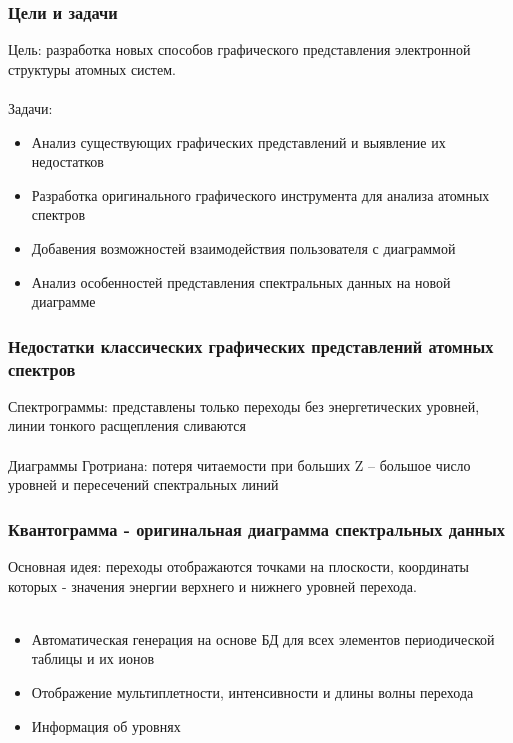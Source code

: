 \documentclass{beamer}
\begin{document}
\begin{frame}
\frametitle{Цели и задачи}
    Цель: разработка новых способов графического представления электронной структуры атомных систем.
     \\~\\
    Задачи:
    \begin{itemize}
        \item Анализ существующих графических представлений и выявление их недостатков
        \item Разработка оригинального графического инструмента для анализа атомных спектров
        \item Добавения возможностей взаимодействия пользователя с диаграммой
        \item Анализ особенностей представления спектральных данных на новой диаграмме
    \end{itemize}
\end{frame}

\begin{frame}
\frametitle{Недостатки классических графических представлений атомных спектров}
    Спектрограммы: представлены только переходы без энергетических уровней, линии тонкого расщепления сливаются
     \\~\\
    Диаграммы Гротриана: потеря читаемости при больших Z – большое число уровней и пересечений спектральных линий
\end{frame}

\begin{frame}
\frametitle{Квантограмма - оригинальная диаграмма спектральных данных}
    Основная идея: переходы отображаются точками на плоскости, координаты которых - значения энергии верхнего и нижнего уровней перехода.
    \\~\\
     \begin{itemize}
        \item Автоматическая генерация на основе БД для всех элементов периодической таблицы и их ионов
        \item Отображение мультиплетности, интенсивности и длины волны перехода
        \item Информация об уровнях
    \end{itemize}
\end{frame}
\end{document}
